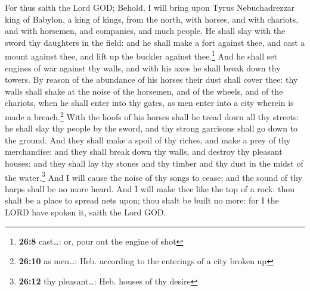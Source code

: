  For thus saith the Lord GOD; Behold, I will bring upon
Tyrus Nebuchadrezzar king of Babylon, a king of kings, from the north,
with horses, and with chariots, and with horsemen, and companies, and
much people.  He shall slay with the sword thy daughters
in the field: and he shall make a fort against thee, and cast a mount
against thee, and lift up the buckler against thee.\footnote{\textbf{26:8}
  cast\ldots: or, pour out the engine of shot}  And he
shall set engines of war against thy walls, and with his axes he shall
break down thy towers.  By reason of the abundance of his
horses their dust shall cover thee: thy walls shall shake at the noise
of the horsemen, and of the wheels, and of the chariots, when he shall
enter into thy gates, as men enter into a city wherein is made a
breach.\footnote{\textbf{26:10} as men\ldots: Heb. according to the
  enterings of a city broken up}  With the hoofs of his
horses shall he tread down all thy streets: he shall slay thy people by
the sword, and thy strong garrisons shall go down to the ground.
 And they shall make a spoil of thy riches, and make a
prey of thy merchandise: and they shall break down thy walls, and
destroy thy pleasant houses: and they shall lay thy stones and thy
timber and thy dust in the midst of the water.\footnote{\textbf{26:12}
  thy pleasant\ldots: Heb. houses of thy desire}  And I
will cause the noise of thy songs to cease; and the sound of thy harps
shall be no more heard.  And I will make thee like the
top of a rock: thou shalt be a place to spread nets upon; thou shalt be
built no more: for I the LORD have spoken it, saith the Lord GOD.

